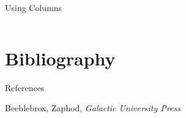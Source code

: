\documentclass[aspectratio=169]{beamer}
\begin{document}
\begin{frame}{Using Columns}
    \begin{columns}
        \lipsum[66]
        \lipsum[66]
    \end{columns}
\end{frame}

\section{Bibliography}
\begin{frame}{References}
\begin{thebibliography}{9}%
Beeblebrox, Zaphod, \textit{Galactic University Press}
\end{thebibliography}
\end{frame}
\end{document}
